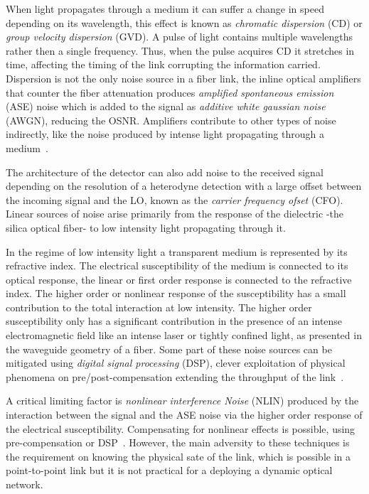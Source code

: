 When light propagates through a medium it can suffer a change in speed depending on its wavelength, this effect is known as \textit{chromatic dispersion} (CD) or \textit{group velocity dispersion} (GVD). A pulse of light contains multiple wavelengths  rather then a single frequency. Thus, when the pulse acquires CD it stretches in time, affecting the timing of the link corrupting the information carried.  Dispersion is not the only noise source in a fiber link, the inline optical amplifiers that counter the fiber attenuation produces \textit{amplified spontaneous emission} (ASE) noise which is added to the signal as \textit{additive white gaussian noise} (AWGN), reducing the OSNR. Amplifiers contribute to other types of noise indirectly, like the noise produced by intense light propagating through a medium~\cite{FiberAgrawal}.

The architecture of the detector can also add noise  to the received signal depending on the resolution of a heterodyne detection with a large offset between the incoming signal and the LO, known as the \textit{carrier frequency ofset} (CFO). Linear sources of noise arise primarily from the response of the dielectric -the silica optical fiber- to low intensity light propagating through it. 

In the regime of low intensity light a transparent medium is represented by its refractive index. The electrical susceptibility of the medium is connected to its optical response, the linear or first order response is connected to the refractive index. The higher order or nonlinear response of the susceptibility has a small contribution to the total interaction at low intensity. The higher order susceptibility only has a significant contribution in the presence of an intense electromagnetic field like an intense laser or tightly confined light, as presented in the waveguide geometry of a fiber. Some part of these noise sources can be mitigated using \textit{digital signal processing} (DSP), clever exploitation of physical phenomena on pre/post-compensation extending the throughput of the link~\cite{agrawalapplications}.     
      


A critical limiting factor is \textit{nonlinear interference Noise} (NLIN) produced by the interaction between the signal and the ASE noise via the higher order response of the electrical susceptibility. Compensating for nonlinear effects is possible, using pre-compensation or DSP~\cite{NLPNinCFO}. However, the main adversity to these techniques is the requirement on knowing the physical sate of the link, which is possible in a point-to-point link but it is not practical for a deploying a dynamic optical network. 

